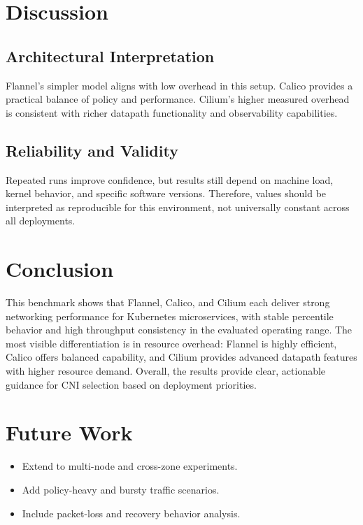 \documentclass[12pt,a4paper]{article}
\begin{document}
\section{Discussion}
\subsection{Architectural Interpretation}
Flannel's simpler model aligns with low overhead in this setup. Calico provides a practical balance of policy and performance. Cilium's higher measured overhead is consistent with richer datapath functionality and observability capabilities.

\subsection{Reliability and Validity}
Repeated runs improve confidence, but results still depend on machine load, kernel behavior, and specific software versions. Therefore, values should be interpreted as reproducible for this environment, not universally constant across all deployments.

\section{Conclusion}
This benchmark shows that Flannel, Calico, and Cilium each deliver strong networking performance for Kubernetes microservices, with stable percentile behavior and high throughput consistency in the evaluated operating range. The most visible differentiation is in resource overhead: Flannel is highly efficient, Calico offers balanced capability, and Cilium provides advanced datapath features with higher resource demand. Overall, the results provide clear, actionable guidance for CNI selection based on deployment priorities.

\section{Future Work}
\begin{itemize}[leftmargin=1.5em]
    \item Extend to multi-node and cross-zone experiments.
    \item Add policy-heavy and bursty traffic scenarios.
    \item Include packet-loss and recovery behavior analysis.
\end{itemize}
\end{document}
